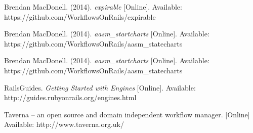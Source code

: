 \begin{thebibliography}{99}
Brendan MacDonell. (2014). \textit{expirable} [Online]. Available: https://github.com/WorkflowsOnRails/expirable

Brendan MacDonell. (2014). \textit{aasm\_startcharts} [Online]. Available: https://github.com/WorkflowsOnRails/aasm\_statecharts

Brendan MacDonell. (2014). \textit{aasm\_startcharts} [Online]. Available: https://github.com/WorkflowsOnRails/aasm\_statecharts

RailsGuides. \textit{Getting Started with Engines} [Online]. Available: http://guides.rubyonrails.org/engines.html

Taverna -- an open source and domain independent workflow manager. [Online] Available: http://www.taverna.org.uk/

\end{thebibliography}

%    
%    

